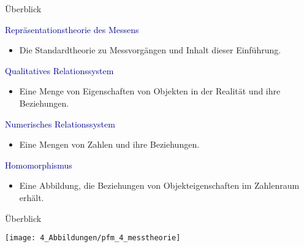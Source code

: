 \documentclass[
  8pt,
  ignorenonframetext,
]{beamer}
\providecommand{\tightlist}{%
  \setlength{\itemsep}{0pt}\setlength{\parskip}{0pt}}
\begin{document}
\begin{frame}{Überblick}
\protect\hypertarget{uxfcberblick-5}{}

\textcolor{darkblue}{Repräsentationstheorie des Messens}

\begin{itemize}
\tightlist
\item
  Die Standardtheorie zu Messvorgängen und Inhalt dieser Einführung.
\end{itemize}

\textcolor{darkblue}{Qualitatives Relationssystem}

\begin{itemize}
\tightlist
\item
  Eine Menge von Eigenschaften von Objekten in der Realität und ihre
  Beziehungen.
\end{itemize}

\textcolor{darkblue}{Numerisches Relationssystem}

\begin{itemize}
\tightlist
\item
  Eine Mengen von Zahlen und ihre Beziehungen.
\end{itemize}

\textcolor{darkblue}{Homomorphismus}

\begin{itemize}
\tightlist
\item
  Eine Abbildung, die Beziehungen von Objekteigenschaften im Zahlenraum
  erhält.
\end{itemize}
\end{frame}

\begin{frame}{Überblick}
\protect\hypertarget{uxfcberblick-6}{}
\vfill

\begin{center}\texttt{[image: 4\_Abbildungen/pfm\_4\_messtheorie]} \end{center}
\end{frame}
\end{document}
